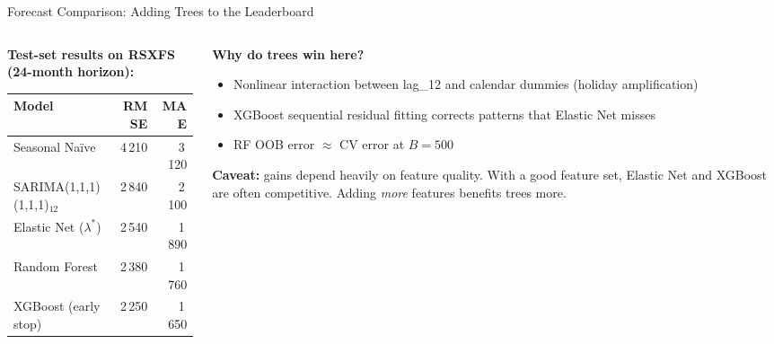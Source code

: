 \documentclass[aspectratio=169, 10pt]{beamer}
\begin{document}
\begin{frame}{Forecast Comparison: Adding Trees to the Leaderboard}
  \begin{columns}[T]
    \begin{column}{0.52\textwidth}
      \textbf{Test-set results on RSXFS (24-month horizon):}
      \begin{center}
      \footnotesize
      \begin{tabular}{lrr}
        \toprule
        \textbf{Model} & \textbf{RMSE} & \textbf{MAE} \\
        \midrule
        Seasonal Naïve            & 4\,210 & 3\,120 \\
        SARIMA(1,1,1)(1,1,1)$_{12}$  & 2\,840 & 2\,100 \\
        Elastic Net ($\lambda^*$) & 2\,540 & 1\,890 \\
        Random Forest             & 2\,380 & 1\,760 \\
        XGBoost (early stop)      & 2\,250 & 1\,650 \\
        \bottomrule
      \end{tabular}
      \end{center}
    \end{column}
    \begin{column}{0.44\textwidth}
      \textbf{Why do trees win here?}
      \begin{itemize}
        \item Nonlinear interaction between lag\_12 and
              calendar dummies (holiday amplification)
        \item XGBoost sequential residual fitting
              corrects patterns that Elastic Net misses
        \item RF OOB error $\approx$ CV error at $B=500$
      \end{itemize}

      \medskip
      \textbf{Caveat:} gains depend heavily on feature quality.
      With a good feature set, Elastic Net and XGBoost are often
      competitive. Adding \emph{more} features benefits trees more.

      \medskip
    \end{column}
  \end{columns}
\end{frame}
\end{document}
